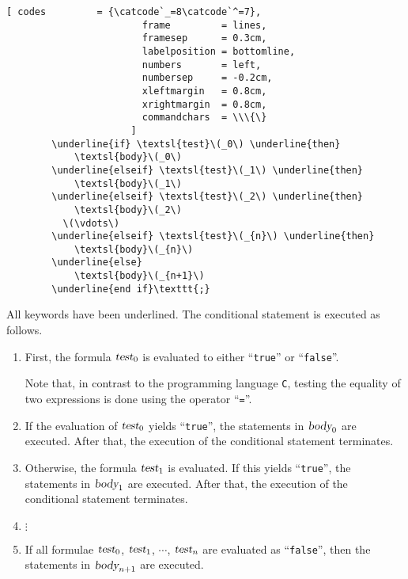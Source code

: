 \begin{enumerate}
      \begin{Verbatim}[ codes         = {\catcode`_=8\catcode`^=7},
                        frame         = lines, 
                        framesep      = 0.3cm, 
                        labelposition = bottomline,
                        numbers       = left,
                        numbersep     = -0.2cm,
                        xleftmargin   = 0.8cm,
                        xrightmargin  = 0.8cm,
                        commandchars  = \\\{\}
                      ]
        \underline{if} \textsl{test}\(_0\) \underline{then}
            \textsl{body}\(_0\)
        \underline{elseif} \textsl{test}\(_1\) \underline{then}
            \textsl{body}\(_1\)
        \underline{elseif} \textsl{test}\(_2\) \underline{then}
            \textsl{body}\(_2\)
          \(\vdots\)
        \underline{elseif} \textsl{test}\(_{n}\) \underline{then}
            \textsl{body}\(_{n}\)
        \underline{else}
            \textsl{body}\(_{n+1}\)
        \underline{end if}\texttt{;}
      \end{Verbatim}
      All keywords have been underlined.  The conditional statement is executed as follows.
      \begin{enumerate}
      \item First, the formula $\textsl{test}_0$  is evaluated to either ``\texttt{true}''
            or ``\texttt{false}''.

            Note that, in contrast to the programming language \texttt{C},
            testing the equality of two expressions is done using the operator 
            ``\texttt{=}''.
      \item If the evaluation of $\textsl{test}_0$ yields 
            ``\texttt{true}'', the statements in 
            $\textsl{body}_0$ are executed.  After that, the execution of the conditional
            statement terminates.
      \item Otherwise, the formula $\textsl{test}_1$ is evaluated.  If this yields
            ``\texttt{true}'', the statements in 
            $\textsl{body}_1$ are executed.  After that, the execution of the conditional
            statement terminates.
      \item $\vdots$
      \item If all formulae $\textsl{test}_0$, $\textsl{test}_1$, $\cdots$,
            $\textsl{test}_{n}$ are evaluated as ``\texttt{false}'', then the statements
            in $\textsl{body}_{n+1}$ are executed.
      \end{enumerate}
\end{enumerate}
